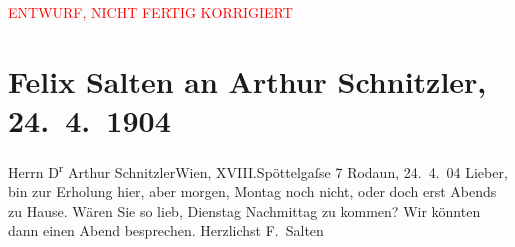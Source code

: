 
\begin{center}
            \textcolor{red}{ENTWURF, NICHT FERTIG KORRIGIERT}
                      \end{center}
            
         \renewcommand{\erwaehnteOrte}{Orte: Edmund-Weiß-Gasse, Rodaun, Wien, XVIII., Währing}
         \renewcommand{\erwaehnteWerke}{}
               \section[Felix Salten an Arthur Schnitzler, 24. 4. 1904]{ Felix Salten an Arthur Schnitzler, 24. 4. 1904}\nopagebreak{}\rehead{ }\begin{ledgroupsized}[t]{13cm}\normalsize\beginnumbering \toendnotes[C]{\smallbreak\pagebreak[2]} 
\pstart{}{\pb} Herrn D\textsuperscript{r} Arthur Schnitzler\pend{}\pstart{}Wien, XVIII.\pend{}\pstart{}Spöttelgaſse 7\pend{}{\bigskip}\pstart
           \raggedleft{}{\pb}Rodaun, 24. 4. 04\pend
           \pstart
           Lieber, bin zur Erholung hier, aber morgen, Montag noch
               nicht, oder doch erst Abends zu Hause. Wären Sie so lieb, Dienstag
               Nachmittag zu kommen? Wir könnten dann einen Abend besprechen. \pend
           \pstart Herzlichst \spacefill\mbox{F. Salten}\pend{}
         
         \endnumbering{}\end{ledgroupsized}\begin{anhang}\end{anhang}\newcommand{\dateiname}{L03396}\newcommand{\titel}{Felix Salten an Arthur Schnitzler, 24. 4. 1904}\newcommand{\editorInnen}{Martin Anton Müller und Laura Untner}
      